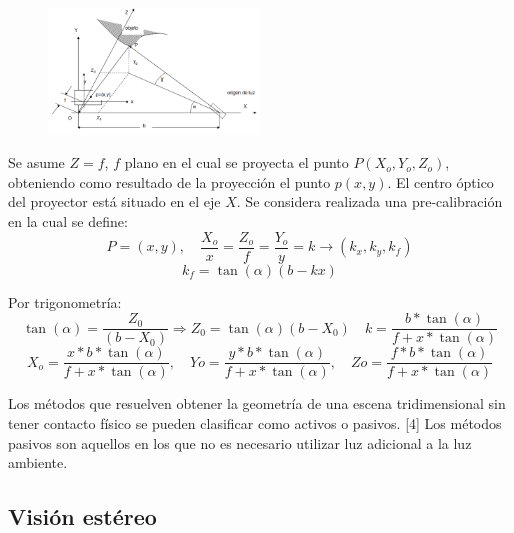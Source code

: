 \begin{figure}[H]
  \centering
    \includegraphics[width=0.5\textwidth]{./Cap6_reconstruccion/triangulacion-2.PNG}
  \caption{}
  \label{fig:Triangulacion2}
\end{figure}

Se asume $Z = f$, $f$ plano en el cual se proyecta el punto $P(X_o,Y_o,Z_o)$, obteniendo como resultado de la proyección el punto $p(x,y)$.
El centro óptico del proyector está situado en el eje $X$.
Se considera realizada una pre-calibración en la cual se define:
\[
P = (x,y), \quad \frac{X_o}{x} = \frac{Z_o}{f} = \frac{Y_o}{y} = k \to (k_x,k_y,k_f)
\]
\[
k_f = \tan (\alpha)(b - kx)
\]

Por trigonometría:
\[
\tan (\alpha) = \frac{Z_0}{(b - X_0)} \Rightarrow Z_0 = \tan (\alpha) (b - X_0) \quad k = \frac	{b * \tan (\alpha)}{f + x * \tan (\alpha)}
\]
\[
X_o = \frac{x * b * \tan (\alpha)}{f + x * \tan (\alpha)}, \quad Yo = \frac{y * b * \tan (\alpha)}{f + x * \tan (\alpha)},\quad Zo = \frac{f * b * \tan (\alpha)}{f + x * \tan (\alpha)}
\]

Los métodos que resuelven obtener la geometría de una escena tridimensional sin tener contacto físico se pueden clasificar como activos o pasivos. [4]
Los métodos pasivos son aquellos en los que no es necesario utilizar luz adicional a la luz ambiente.

\subsection{Visión estéreo}

